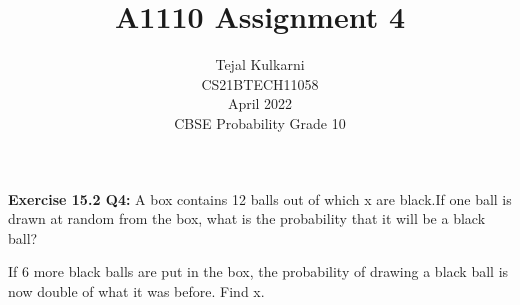 \documentclass[journal,12pt,two column]{IEEEtran}
\title{A1110 Assignment 4 }
\author{Tejal Kulkarni \\ CS21BTECH11058 \\\vspace*{20pt} April 2022 \\ CBSE Probability Grade 10 }
\begin{document}
\newcommand{\solution}{\noindent \textbf{Solution: }}
\providecommand{\pr}[1]{\ensuremath{\Pr\left(#1\right)}}
\providecommand{\qfunc}[1]{\ensuremath{Q\left(#1\right)}}
\providecommand{\sbrak}[1]{\ensuremath{{}\left[#1\right]}}
\providecommand{\lsbrak}[1]{\ensuremath{{}\left[#1\right.}}
\providecommand{\rsbrak}[1]{\ensuremath{{}\left.#1\right]}}
\providecommand{\brak}[1]{\ensuremath{\left(#1\right)}}
\providecommand{\lbrak}[1]{\ensuremath{\left(#1\right.}}
\providecommand{\rbrak}[1]{\ensuremath{\left.#1\right)}}
\providecommand{\cbrak}[1]{\ensuremath{\left\{#1\right\}}}
\providecommand{\lcbrak}[1]{\ensuremath{\left\{#1\right.}}
\providecommand{\rcbrak}[1]{\ensuremath{\left.#1\right\}}}
\newcommand*{\permcomb}[4][0mu]{{{}^{#3}\mkern#1#2_{#4}}}
\newcommand*{\perm}[1][-3mu]{\permcomb[#1]{P}}
\newcommand*{\comb}[1][-1mu]{\permcomb[#1]{C}}
\renewcommand{\thetable}{\arabic{table}} 

\maketitle

\textbf{Exercise 15.2 Q4:} A box contains 12 balls out of which x are black.If one ball is drawn at random from the box, what is the probability that it will be a black ball?

If 6 more black balls are put in the box, the probability of drawing a black ball is now double of what it was before. Find x.
\end{document}
